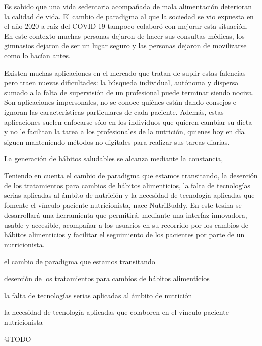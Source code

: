 Es sabido que una vida sedentaria acompañada de mala alimentación deterioran la calidad de vida. El cambio de paradigma al que la sociedad se vio expuesta en el año 2020 a raíz del COVID-19 tampoco colaboró con mejorar esta situación. En este contexto muchas personas dejaron de hacer sus consultas médicas, los gimnasios dejaron de ser un lugar seguro y las personas dejaron de movilizarse como lo hacían antes. 

Existen muchas aplicaciones en el mercado que tratan de suplir estas falencias pero traen nuevas dificultades: la búsqueda individual, autónoma y dispersa sumado a la falta de supervisión de un profesional puede terminar siendo nociva. Son aplicaciones impersonales, no se conoce quiénes están dando consejos e ignoran las características particulares de cada paciente. Además, estas aplicaciones suelen enfocarse sólo en los individuos que quieren cambiar su dieta y no le facilitan la tarea a los profesionales de la nutrición, quienes hoy en día siguen manteniendo métodos no-digitales para realizar sus tareas diarias.

La generación de hábitos saludables se alcanza mediante la constancia,  



Teniendo en cuenta el cambio de paradigma que estamos transitando, la deserción de los tratamientos para cambios de hábitos alimenticios, la falta de tecnologías serias aplicadas al ámbito de nutrición y la necesidad de tecnología aplicadas que fomente el vínculo paciente-nutricionista, nace NutriBuddy. En este tesina se desarrollará una herramienta que permitirá, mediante una interfaz innovadora, usable y accesible, acompañar a los usuarios en su recorrido por los cambios de hábitos alimenticios y facilitar el seguimiento de los pacientes por parte de un nutricionista.


\cite{educacionPrimaria2018}


el cambio de paradigma que estamos transitando

deserción de los tratamientos para cambios de hábitos alimenticios

la falta de tecnologías serias aplicadas al ámbito de nutrición

la necesidad de tecnología aplicadas que colaboren en el vínculo paciente-nutricionista

@TODO